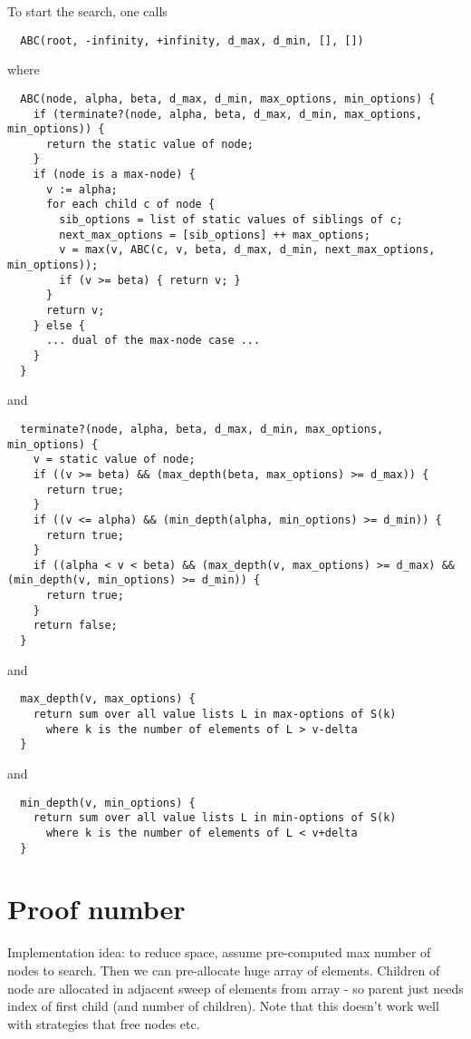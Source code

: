 \documentclass[10pt,dvipdfmx]{report}
\begin{document}
To start the search, one calls
{\scriptsize
\begin{verbatim}
  ABC(root, -infinity, +infinity, d_max, d_min, [], [])
\end{verbatim}
}
where
{\scriptsize
\begin{verbatim}
  ABC(node, alpha, beta, d_max, d_min, max_options, min_options) {
    if (terminate?(node, alpha, beta, d_max, d_min, max_options, min_options)) {
      return the static value of node;
    }
    if (node is a max-node) {
      v := alpha;
      for each child c of node {
        sib_options = list of static values of siblings of c;
        next_max_options = [sib_options] ++ max_options;
        v = max(v, ABC(c, v, beta, d_max, d_min, next_max_options, min_options));
        if (v >= beta) { return v; }
      }
      return v;
    } else {
      ... dual of the max-node case ...
    }
  }
\end{verbatim}
}
and
{\scriptsize
\begin{verbatim}
  terminate?(node, alpha, beta, d_max, d_min, max_options, min_options) {
    v = static value of node;
    if ((v >= beta) && (max_depth(beta, max_options) >= d_max)) {
      return true;
    }
    if ((v <= alpha) && (min_depth(alpha, min_options) >= d_min)) {
      return true;
    }
    if ((alpha < v < beta) && (max_depth(v, max_options) >= d_max) && (min_depth(v, min_options) >= d_min)) {
      return true;
    }
    return false;
  }
\end{verbatim}
}
and
{\scriptsize
\begin{verbatim}
  max_depth(v, max_options) {
    return sum over all value lists L in max-options of S(k)
      where k is the number of elements of L > v-delta
  }
\end{verbatim}
}
and
{\scriptsize
\begin{verbatim}
  min_depth(v, min_options) {
    return sum over all value lists L in min-options of S(k)
      where k is the number of elements of L < v+delta
  }
\end{verbatim}
}

\section{Proof number}

Implementation idea: to reduce space, assume pre-computed max number of nodes to search.  Then we can 
pre-allocate huge array of elements.  Children of node are allocated in adjacent sweep of elements from
array - so parent just needs index of first child (and number of children).  Note that this doesn't work
well with strategies that free nodes etc.
\end{document}
